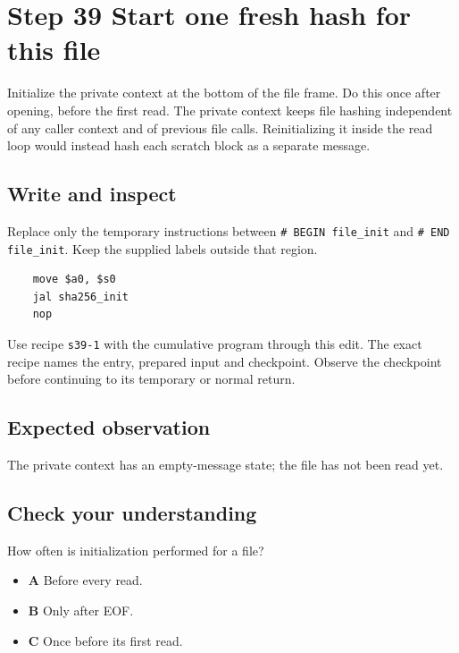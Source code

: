 \section{Step 39 Start one fresh hash for this file}\label{sha-s39}

Initialize the private context at the bottom of the file frame. Do this once after opening, before the first read. The private context keeps file hashing independent of any caller context and of previous file calls. Reinitializing it inside the read loop would instead hash each scratch block as a separate message.

\subsection{Write and inspect}
Replace only the temporary instructions between \texttt{\# BEGIN file\_init} and \texttt{\# END file\_init}. Keep the supplied labels outside that region.

\begin{verbatim}
    move $a0, $s0
    jal sha256_init
    nop
\end{verbatim}

Use recipe \texttt{s39-1} with the cumulative program through this edit. The exact recipe names the entry, prepared input and checkpoint. Observe the checkpoint before continuing to its temporary or normal return.

\subsection{Expected observation}
The private context has an empty-message state; the file has not been read yet.

\subsection{Check your understanding}
How often is initialization performed for a file?

\begin{itemize}
  \item \textbf{A} Before every read.
  \item \textbf{B} Only after EOF.
  \item \textbf{C} Once before its first read.
\end{itemize}

